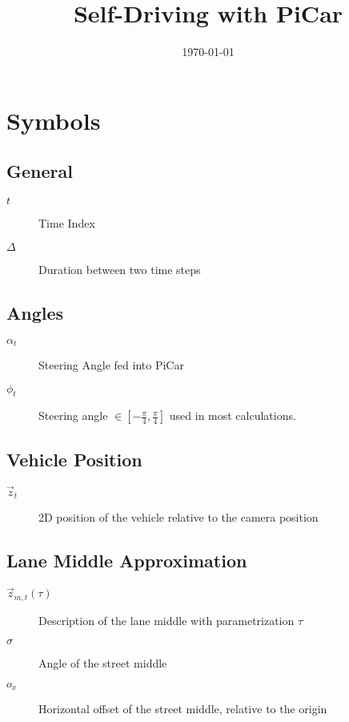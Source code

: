 \documentclass[a4paper]{article}
\title{Self-Driving with PiCar}
\date{\today}
\begin{document}
    
    \maketitle

    \section{Symbols}
    \subsection{General}
    \begin{description}
        \item[$t$] Time Index
        \item[$\Delta$] Duration between two time steps 
    \end{description}

    \subsection{Angles} 
    \begin{description}
        \item[$\alpha_t$] Steering Angle fed into PiCar
        \item[$\phi_t$] Steering angle $\in [-\frac{\pi}{4}, \frac{\pi}{4}]$ used in most calculations.
    \end{description}

    \subsection{Vehicle Position}
    \begin{description}
        \item[$\vec{z}_t$] 2D position of the vehicle relative to the camera position
    \end{description}

    \subsection{Lane Middle Approximation}
    \begin{description}
        \item[$\vec{z}_{m,t}(\tau)$] Description of the lane middle with parametrization $\tau$
        \item[$\sigma$] Angle of the street middle
        \item[$o_x$] Horizontal offset of the street middle, relative to the origin
    \end{description}
\end{document}
